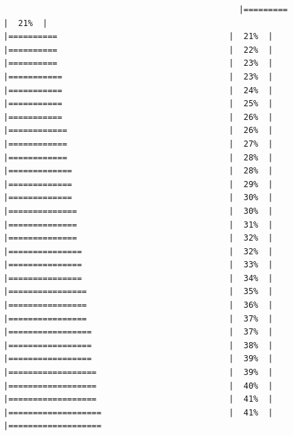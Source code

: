 \documentclass[
  krantz2]{krantz}
\begin{document}
\begin{verbatim}
                                                |=========                                    |  21%  |                                                     |==========                                   |  21%  |                                                     |==========                                   |  22%  |                                                     |==========                                   |  23%  |                                                     |===========                                  |  23%  |                                                     |===========                                  |  24%  |                                                     |===========                                  |  25%  |                                                     |===========                                  |  26%  |                                                     |============                                 |  26%  |                                                     |============                                 |  27%  |                                                     |============                                 |  28%  |                                                     |=============                                |  28%  |                                                     |=============                                |  29%  |                                                     |=============                                |  30%  |                                                     |==============                               |  30%  |                                                     |==============                               |  31%  |                                                     |==============                               |  32%  |                                                     |===============                              |  32%  |                                                     |===============                              |  33%  |                                                     |===============                              |  34%  |                                                     |================                             |  35%  |                                                     |================                             |  36%  |                                                     |================                             |  37%  |                                                     |=================                            |  37%  |                                                     |=================                            |  38%  |                                                     |=================                            |  39%  |                                                     |==================                           |  39%  |                                                     |==================                           |  40%  |                                                     |==================                           |  41%  |                                                     |===================                          |  41%  |                                                     |===================           
\end{verbatim}
\end{document}
